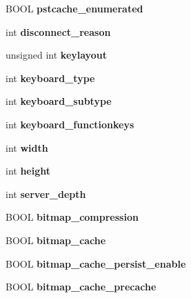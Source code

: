 \begin{DoxyCompactItemize}
B\+O\+OL {\bfseries pstcache\+\_\+enumerated}
\item 
\mbox{\label{structrdpclient_aced12c9347a42683ad97e8bf8800f1b3}} 
int {\bfseries disconnect\+\_\+reason}
\item 
\mbox{\label{structrdpclient_a4996285a3644536b80ca28298464dbb7}} 
unsigned int {\bfseries keylayout}
\item 
\mbox{\label{structrdpclient_a226a4759b0c25ca80b5581c805a79d6a}} 
int {\bfseries keyboard\+\_\+type}
\item 
\mbox{\label{structrdpclient_a1b2bc6af3af7a02064dc86b709c5ff65}} 
int {\bfseries keyboard\+\_\+subtype}
\item 
\mbox{\label{structrdpclient_a52bb48b20310d6773d217f02fd14210d}} 
int {\bfseries keyboard\+\_\+functionkeys}
\item 
\mbox{\label{structrdpclient_a4666b79ca99a1b26d9b5ba3db2fee90f}} 
int {\bfseries width}
\item 
\mbox{\label{structrdpclient_afa30cc215e4348828ae50de9c72f6bc6}} 
int {\bfseries height}
\item 
\mbox{\label{structrdpclient_a5d9862ca8ce0d5e203be63e5555a79f1}} 
int {\bfseries server\+\_\+depth}
\item 
\mbox{\label{structrdpclient_ab97ef508b90346331bf0f2e54cadee62}} 
B\+O\+OL {\bfseries bitmap\+\_\+compression}
\item 
\mbox{\label{structrdpclient_a2034d940d52e42965f20dd4f7b94ed39}} 
B\+O\+OL {\bfseries bitmap\+\_\+cache}
\item 
\mbox{\label{structrdpclient_a39d72d1b6c12ffd2dc1cf941c648cd8d}} 
B\+O\+OL {\bfseries bitmap\+\_\+cache\+\_\+persist\+\_\+enable}
\item 
\mbox{\label{structrdpclient_a60073bc503d6e9eaf46e4f4af9e1593a}} 
B\+O\+OL {\bfseries bitmap\+\_\+cache\+\_\+precache}

\end{DoxyCompactItemize}
